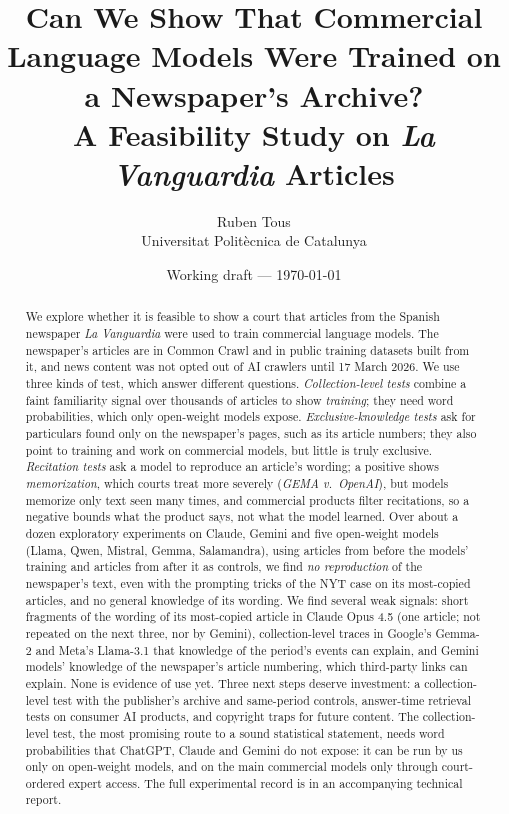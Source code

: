\documentclass[10pt,a4paper]{article}
\title{Can We Show That Commercial Language Models Were Trained on a Newspaper's Archive?\\
\large A Feasibility Study on \emph{La Vanguardia} Articles}
\author{Ruben Tous\\ \small Universitat Polit\`ecnica de Catalunya}
\date{\small Working draft --- \today}
\begin{document}
\maketitle

\begin{abstract}
We explore whether it is feasible to show a court that articles from the Spanish newspaper \emph{La Vanguardia}
were used to train commercial language models. The newspaper's articles are in Common Crawl and in public
training datasets built from it, and news content was not opted out of AI crawlers until 17 March 2026.
We use three kinds of test, which answer different questions. \emph{Collection-level tests} combine a faint
familiarity signal over thousands of articles to show \emph{training}; they need word probabilities, which only
open-weight models expose. \emph{Exclusive-knowledge tests} ask for particulars found only on the newspaper's pages,
such as its article numbers; they also point to training and work on commercial models, but little is truly
exclusive. \emph{Recitation tests} ask a model to reproduce an article's wording; a positive shows
\emph{memorization}, which courts treat more severely (\emph{GEMA v.\ OpenAI}), but models memorize only text seen many
times, and commercial products filter recitations, so a negative bounds what the product says, not what the model
learned. Over about a dozen exploratory experiments on Claude, Gemini and five open-weight models (Llama, Qwen, Mistral, Gemma, Salamandra), using
articles from before the models' training and articles from after it as controls, we find \emph{no reproduction} of
the newspaper's text, even with the prompting tricks of the NYT case on its most-copied articles, and no general
knowledge of its wording. We find several weak signals: short fragments of the wording of its most-copied article in
Claude Opus 4.5 (one article; not repeated on the next three, nor by Gemini), collection-level traces in
Google's Gemma-2 and Meta's Llama-3.1 that knowledge of the period's events can explain, and Gemini models'
knowledge of the newspaper's article numbering, which third-party links can explain. None is evidence of use yet. Three next steps deserve investment: a collection-level test with the publisher's archive and same-period controls,
answer-time retrieval tests on consumer AI products, and copyright traps for future content. The collection-level
test, the most promising route to a sound statistical statement, needs word probabilities that ChatGPT, Claude and
Gemini do not expose: it can be run by us only on open-weight models, and on the main commercial models only through
court-ordered expert access. The full experimental
record is in an accompanying technical report.
\end{abstract}
\end{document}
